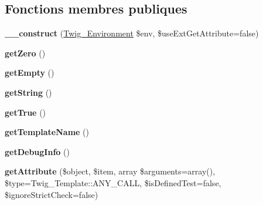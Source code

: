 \subsection*{Fonctions membres publiques}
\begin{DoxyCompactItemize}
\item 
{\bfseries \+\_\+\+\_\+construct} (\hyperlink{class_twig___environment}{Twig\+\_\+\+Environment} \$env, \$use\+Ext\+Get\+Attribute=false)\hypertarget{class_twig___template_test_a3bdc5a840185f787b30935bb032c76df}{}\label{class_twig___template_test_a3bdc5a840185f787b30935bb032c76df}

\item 
{\bfseries get\+Zero} ()\hypertarget{class_twig___template_test_a30235396cad4c27db5ffc4874bc66c17}{}\label{class_twig___template_test_a30235396cad4c27db5ffc4874bc66c17}

\item 
{\bfseries get\+Empty} ()\hypertarget{class_twig___template_test_a30ba49b93b8b0b6451d9fd4b9c2d6e97}{}\label{class_twig___template_test_a30ba49b93b8b0b6451d9fd4b9c2d6e97}

\item 
{\bfseries get\+String} ()\hypertarget{class_twig___template_test_afde980915cc78c408e6ac75b662e631c}{}\label{class_twig___template_test_afde980915cc78c408e6ac75b662e631c}

\item 
{\bfseries get\+True} ()\hypertarget{class_twig___template_test_afa50483ece53d0068f38cffd89b7c391}{}\label{class_twig___template_test_afa50483ece53d0068f38cffd89b7c391}

\item 
{\bfseries get\+Template\+Name} ()\hypertarget{class_twig___template_test_a621a3ccd148ed8b9e937da6959c98f39}{}\label{class_twig___template_test_a621a3ccd148ed8b9e937da6959c98f39}

\item 
{\bfseries get\+Debug\+Info} ()\hypertarget{class_twig___template_test_abd0ecb0136f4228db2bd963bfc1e20d7}{}\label{class_twig___template_test_abd0ecb0136f4228db2bd963bfc1e20d7}

\item 
{\bfseries get\+Attribute} (\$object, \$item, array \$arguments=array(), \$type=Twig\+\_\+\+Template\+::\+A\+N\+Y\+\_\+\+C\+A\+LL, \$is\+Defined\+Test=false, \$ignore\+Strict\+Check=false)\hypertarget{class_twig___template_test_a73808097bd7cf0cceeeae73b71ee8e12}{}\label{class_twig___template_test_a73808097bd7cf0cceeeae73b71ee8e12}

\end{DoxyCompactItemize}

